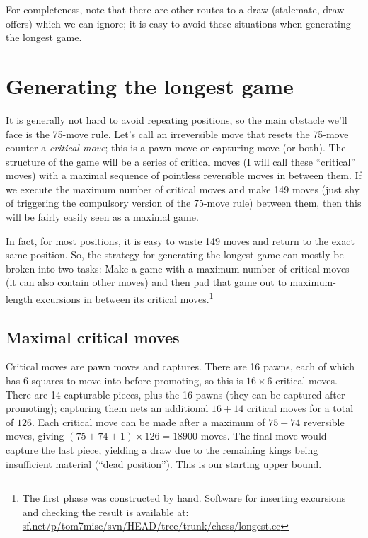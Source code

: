 \documentclass[twocolumn]{article}
\begin{document}
\medskip
For completeness, note that there are other routes to a draw
(stalemate, draw offers) which we can ignore; it is easy to avoid
these situations when generating the longest game.


\section{Generating the longest game}

It is generally not hard to avoid repeating positions, so the main
obstacle we'll face is the 75-move rule. Let's call an irreversible
move that resets the 75-move counter a {\em critical move}; this is
a pawn move or capturing move (or both). The structure of the game
will be a series of critical moves (I will call these ``critical''
moves) with a maximal sequence of pointless reversible moves in
between them. If we execute the maximum number of critical moves and
make 149 moves (just shy of triggering the compulsory version of
the 75-move rule) between them, then this will be fairly easily
seen as a maximal game.

In fact, for most positions, it is easy to waste 149 moves and return
to the exact same position. So, the strategy for generating the
longest game can mostly be broken into two tasks: Make a game with a
maximum number of critical moves (it can also contain other moves) and
then pad that game out to maximum-length excursions in between its
critical moves.\footnote{The first phase was constructed by hand.
  Software for inserting excursions and checking the result is
  available at:
  \url{sf.net/p/tom7misc/svn/HEAD/tree/trunk/chess/longest.cc} }

\subsection{Maximal critical moves} \label{sec:maxcritical}

Critical moves are pawn moves and captures. There are 16 pawns, each
of which has 6 squares to move into before promoting, so this is
$16\times 6$ critical moves. There are 14 capturable pieces, plus the
16 pawns (they can be captured after promoting); capturing them nets an
additional $16+14$ critical moves for a total of $126$. Each critical
move can be made after a maximum of $75+74$ reversible moves, giving
$(75+74+1) \times 126 = 18900$ moves. The final move would capture the
last piece, yielding a draw due to the remaining kings being insufficient
material (``dead position''). This is our starting upper bound.
\end{document}
